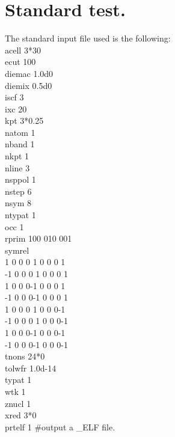 \documentclass[a4paper,12pt]{report}
\begin{document}
\section{Standard test.}
\label{section1}
The standard input file used is the following:\\
acell 3*30\\
ecut 100\\
diemac 1.0d0\\
diemix 0.5d0\\
iscf 3\\
ixc 20\\
kpt 3*0.25\\
natom 1\\
nband 1\\
nkpt 1\\
nline 3\\
nsppol 1\\
nstep 6\\
nsym 8\\
ntypat 1\\
occ 1\\
rprim 100 010 001\\
symrel\\
 1 0 0\hspace{0.3cm}   0 1 0\hspace{0.3cm}   0 0 1\\
-1 0 0\hspace{0.3cm}   0 1 0\hspace{0.3cm}   0 0 1\\
 1 0 0\hspace{0.3cm}   0-1 0\hspace{0.3cm}   0 0 1\\
-1 0 0\hspace{0.3cm}   0-1 0\hspace{0.3cm}   0 0 1\\
 1 0 0\hspace{0.3cm}   0 1 0\hspace{0.3cm}   0 0-1\\
-1 0 0\hspace{0.3cm}   0 1 0\hspace{0.3cm}   0 0-1\\
 1 0 0\hspace{0.3cm}   0-1 0\hspace{0.3cm}   0 0-1\\
-1 0 0\hspace{0.3cm}   0-1 0\hspace{0.3cm}   0 0-1\\
tnons 24*0\\
tolwfr 1.0d-14\\
typat 1\\
wtk 1\\
znucl 1\\
xred 3*0\\
prtelf  1  \#output a  \_ELF file.\\\\\\\\\\\
\end{document}
